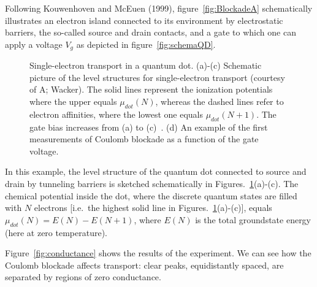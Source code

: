 Following Kouwenhoven and McEuen (1999), figure~\ref{fig:BlockadeA} schematically illustrates an electron island connected to its environment by electrostatic barriers, the so-called source and drain contacts, and a gate to which one can apply a voltage $V_g$ as depicted in figure~\ref{fig:schemaQD}.
\begin{figure}
 \centering
{}



 \caption{Single-electron transport in a quantum dot. \newline (a)-(c) Schematic picture of the level structures for single-electron transport (courtesy of A; Wacker). The solid lines represent the ionization potentials where the upper equals $\mu_{dot}(N)$, whereas the dashed lines refer to electron affinities, where the lowest one equals $\mu_{dot}(N+1)$. The gate bias increases from (a) to (c)~\cite{reimannManninen}. \newline(d) An example of the first measurements of Coulomb blockade as a function of the gate voltage.}
 \label{fig:Blockade}
\end{figure}

In this example, the level structure of the quantum dot connected to source and drain by tunneling barriers is sketched schematically in Figures.~\ref{fig:Blockade}(a)-(c).
The chemical potential inside the dot, where the discrete quantum states are filled with $N$ electrons [i.e.\, the highest solid line in Figures.~\ref{fig:Blockade}(a)-(c)], equals $\mu_{dot}(N)=E(N)-E(N+1)$, where $E(N)$ is the total groundstate energy (here at zero temperature).

Figure~\ref{fig:conductance} shows the results of the experiment. We can see how the Coulomb blockade affects transport: clear peaks, equidistantly spaced, are separated by regions of zero conductance.

